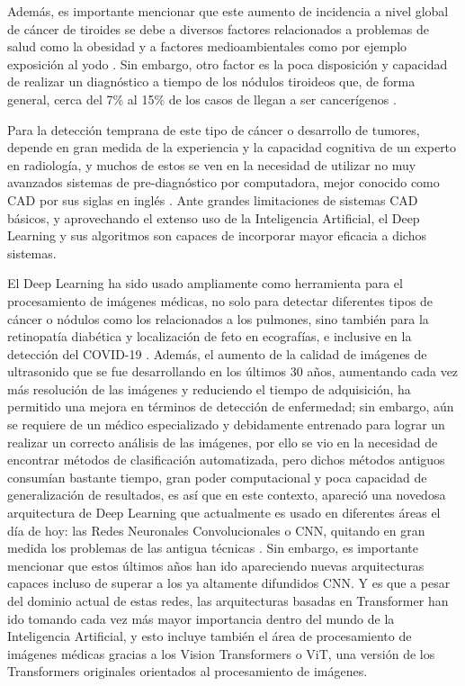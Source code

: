 Además, es importante mencionar que este aumento de incidencia a nivel global de cáncer de tiroides se debe a diversos factores relacionados a problemas de salud como la obesidad y a factores medioambientales como por ejemplo exposición al yodo \parencite{pr_kim2020geoinflu}. Sin embargo, otro factor es la poca disposición y capacidad de realizar un diagnóstico a tiempo de los nódulos tiroideos que, de forma general, cerca del 7\% al 15\% de los casos de llegan a ser cancerígenos \parencite{pr_haugen2016amethy}.

Para la detección temprana de este tipo de cáncer o desarrollo de tumores, depende en gran medida de la experiencia y la capacidad cognitiva de un experto en radiología, y muchos de estos se ven en la necesidad de utilizar no muy avanzados sistemas de pre-diagnóstico por computadora, mejor conocido como CAD por sus siglas en inglés \parencite{pr_zhu2021agendlframew}. Ante grandes limitaciones de sistemas CAD básicos, y aprovechando el extenso uso de la Inteligencia Artificial, el Deep Learning y sus algoritmos son capaces de incorporar mayor eficacia a dichos sistemas.

El Deep Learning ha sido usado ampliamente como herramienta para el procesamiento de imágenes médicas, no solo para detectar diferentes tipos de cáncer o nódulos como los relacionados a los pulmones, sino también para la retinopatía diabética y localización de feto en ecografías, e inclusive en la detección del COVID-19 \parencite{pr_bhatta2021medimage}. Además, el aumento de la calidad de imágenes de ultrasonido que se fue desarrollando en los últimos 30 años, aumentando cada vez más resolución de las imágenes y reduciendo el tiempo de adquisición, ha permitido una mejora en términos de detección de enfermedad; sin embargo, aún se requiere de un médico especializado y debidamente entrenado para lograr un realizar un correcto análisis de las imágenes, por ello se vio en la necesidad de encontrar métodos de clasificación automatizada, pero dichos métodos antiguos consumían bastante tiempo, gran poder computacional y poca capacidad de generalización de resultados, es así que en este contexto, apareció una novedosa arquitectura de Deep Learning que actualmente es usado en diferentes áreas el día de hoy: las Redes Neuronales Convolucionales o CNN, quitando en gran medida los problemas de las antigua técnicas \parencite{pr_signgh20203ddl}. Sin embargo, es importante mencionar que estos últimos años han ido apareciendo nuevas arquitecturas capaces incluso de superar a los ya altamente difundidos CNN. Y es que a pesar del dominio actual de estas redes, las arquitecturas basadas en Transformer han ido tomando cada vez más mayor importancia dentro del mundo de la Inteligencia Artificial, y esto incluye también el área de procesamiento de imágenes médicas gracias a los Vision Transformers o ViT, una versión de los Transformers originales orientados al procesamiento de imágenes.
 
